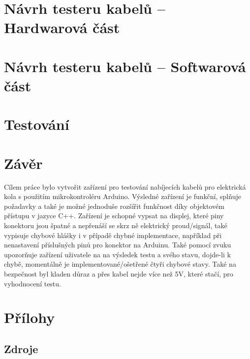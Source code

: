 \documentclass[12pt,a4paper,titlepage]{scrreprt}
\begin{document}
	\chapter{Návrh testeru kabelů – Hardwarová část}
	
	
	\chapter{Návrh testeru kabelů – Softwarová část}
	
	
	
	\chapter{Testování}
	
	
	
	\chapter{Závěr}
	Cílem práce bylo vytvořit zařízení pro testování nabíjecích kabelů pro elektrická kola s použitím mikrokontroléru Arduino. Výsledné zařízení je funkční, splňuje požadavky a také je možné jednoduše rozšířit funkčnost díky objektovém přístupu v jazyce C++. Zařízení je schopné vypsat na displej, které piny konektoru jsou špatné a nepřenáší se skrz ně elektrický proud/signál, také vypisuje chybové hlášky i v případě chybné implementace, například při nenastavení příslušných pinů pro konektor na Arduinu. Také pomocí zvuku upozorňuje zařízení uživatele na na výsledek testu a svého stavu, dojde-li k chybě, momentálně je implementované/ošetřené čtyři chybové stavy. Také na bezpečnost byl kladen důraz a přes kabel nejde více než 5V, které stačí, pro vyhodnocení testu.

	\newpage
	\chapter{Přílohy}
	\section*{Zdroje}
\end{document}
